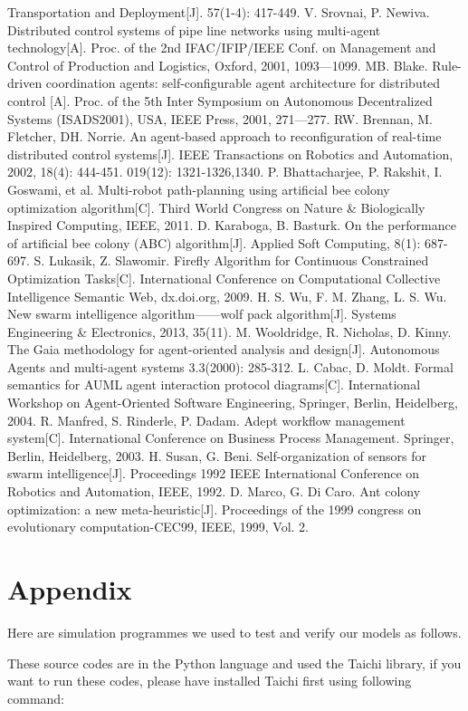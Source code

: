 \documentclass{mcmthesis}
\begin{document}
\begin{thebibliography}{99}
Transportation and Deployment[J]. 57(1-4): 417-449.
\bibitem V. Srovnai, P. Newiva. Distributed control systems of pipe line networks using multi-agent
technology[A]. Proc. of the 2nd IFAC/IFIP/IEEE Conf. on Management and Control of
Production and Logistics, Oxford, 2001, 1093—1099.
\bibitem MB. Blake. Rule-driven coordination agents: self-configurable agent architecture for
distributed control [A]. Proc. of the 5th Inter Symposium on Autonomous Decentralized
Systems (ISADS2001), USA, IEEE Press, 2001, 271—277.
\bibitem RW. Brennan, M. Fletcher, DH. Norrie. An agent-based approach to reconfiguration of
real-time distributed control systems[J]. IEEE Transactions on Robotics and Automation,
2002, 18(4): 444-451.
019(12): 1321-1326,1340.
\bibitem P. Bhattacharjee, P. Rakshit, I. Goswami, et al. Multi-robot path-planning using artificial
bee colony optimization algorithm[C]. Third World Congress on Nature \& Biologically Inspired
Computing, IEEE, 2011.
\bibitem D. Karaboga, B. Basturk. On the performance of artificial bee colony (ABC) algorithm[J].
Applied Soft Computing, 8(1): 687-697.
\bibitem S. Lukasik, Z. Slawomir. Firefly Algorithm for Continuous Constrained Optimization
Tasks[C]. International Conference on Computational Collective Intelligence Semantic Web,
dx.doi.org, 2009.
\bibitem H. S. Wu, F. M. Zhang, L. S. Wu. New swarm intelligence algorithm——wolf pack
algorithm[J]. Systems Engineering \& Electronics, 2013, 35(11).
\bibitem M. Wooldridge, R. Nicholas, D. Kinny. The Gaia methodology for agent-oriented analysis
and design[J]. Autonomous Agents and multi-agent systems 3.3(2000): 285-312.
\bibitem L. Cabac, D. Moldt. Formal semantics for AUML agent interaction protocol
diagrams[C]. International Workshop on Agent-Oriented Software Engineering, Springer,
Berlin, Heidelberg, 2004.
\bibitem R. Manfred, S. Rinderle, P. Dadam. Adept workflow management system[C]. International
Conference on Business Process Management. Springer, Berlin, Heidelberg, 2003.
\bibitem H. Susan, G. Beni. Self-organization of sensors for swarm intelligence[J]. Proceedings
1992 IEEE International Conference on Robotics and Automation, IEEE, 1992.
\bibitem D. Marco, G. Di Caro. Ant colony optimization: a new meta-heuristic[J]. Proceedings of
the 1999 congress on evolutionary computation-CEC99, IEEE, 1999, Vol. 2.
\end{thebibliography}

\newpage
\section{Appendix}
Here are simulation programmes we used to test and verify our models as follows. \par
These source codes are in the Python language and used the Taichi library, if you want to run these codes, please have installed Taichi first using following command:
\end{document}
